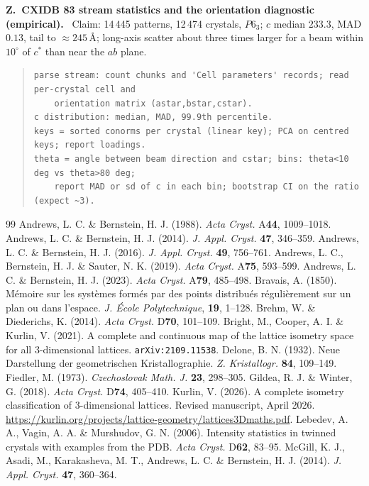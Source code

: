 \documentclass[11pt]{article}
\newcommand{\Ang}{\text{\AA}}
\newcounter{zcheck}
\renewcommand{\thezcheck}{Z.\arabic{zcheck}}
\newcommand{\zitem}[2]{\medskip\noindent\refstepcounter{zcheck}\label{#1}\textbf{\thezcheck\ #2.}\ }
\begin{document}
\zitem{z:xfel}{CXIDB 83 stream statistics and the orientation diagnostic (empirical)}
Claim: 14\,445 patterns, 12\,474 crystals, $P6_3$; $c$ median $233.3$, MAD $0.13$, tail to $\approx245\,\Ang$; long-axis scatter about three times larger for a beam within $10^\circ$ of $c^*$ than near the $ab$ plane.
\begin{quote}\small\begin{verbatim}
parse stream: count chunks and 'Cell parameters' records; read per-crystal cell and
    orientation matrix (astar,bstar,cstar).
c distribution: median, MAD, 99.9th percentile.
keys = sorted conorms per crystal (linear key); PCA on centred keys; report loadings.
theta = angle between beam direction and cstar; bins: theta<10 deg vs theta>80 deg;
    report MAD or sd of c in each bin; bootstrap CI on the ratio (expect ~3).
\end{verbatim}\end{quote}

\begin{thebibliography}{99}
\small
{} Andrews, L. C. \& Bernstein, H. J. (1988). \textit{Acta Cryst.} A\textbf{44}, 1009--1018.
 Andrews, L. C. \& Bernstein, H. J. (2014). \textit{J. Appl. Cryst.} \textbf{47}, 346--359.
 Andrews, L. C. \& Bernstein, H. J. (2016). \textit{J. Appl. Cryst.} \textbf{49}, 756--761.
 Andrews, L. C., Bernstein, H. J. \& Sauter, N. K. (2019). \textit{Acta Cryst.} A\textbf{75}, 593--599.
 Andrews, L. C. \& Bernstein, H. J. (2023). \textit{Acta Cryst.} A\textbf{79}, 485--498.
 Bravais, A. (1850). M\'emoire sur les syst\`emes form\'es par des points distribu\'es r\'eguli\`erement sur un plan ou dans l'espace. \textit{J. \'{E}cole Polytechnique}, \textbf{19}, 1--128.
 Brehm, W. \& Diederichs, K. (2014). \textit{Acta Cryst.} D\textbf{70}, 101--109.
 Bright, M., Cooper, A. I. \& Kurlin, V. (2021). A complete and continuous map of the lattice isometry space for all 3-dimensional lattices. \texttt{arXiv:2109.11538}.
 Delone, B. N. (1932). Neue Darstellung der geometrischen Kristallographie. \textit{Z. Kristallogr.} \textbf{84}, 109--149.
 Fiedler, M. (1973). \textit{Czechoslovak Math. J.} \textbf{23}, 298--305.
 Gildea, R. J. \& Winter, G. (2018). \textit{Acta Cryst.} D\textbf{74}, 405--410.
 Kurlin, V. (2026). A complete isometry classification of 3-dimensional lattices. Revised manuscript, April 2026. \url{https://kurlin.org/projects/lattice-geometry/lattices3Dmaths.pdf}.
 Lebedev, A. A., Vagin, A. A. \& Murshudov, G. N. (2006). Intensity statistics in twinned crystals with examples from the PDB. \textit{Acta Cryst.} D\textbf{62}, 83--95.
 McGill, K. J., Asadi, M., Karakasheva, M. T., Andrews, L. C. \& Bernstein, H. J. (2014). \textit{J. Appl. Cryst.} \textbf{47}, 360--364.
\end{thebibliography}
\end{document}
